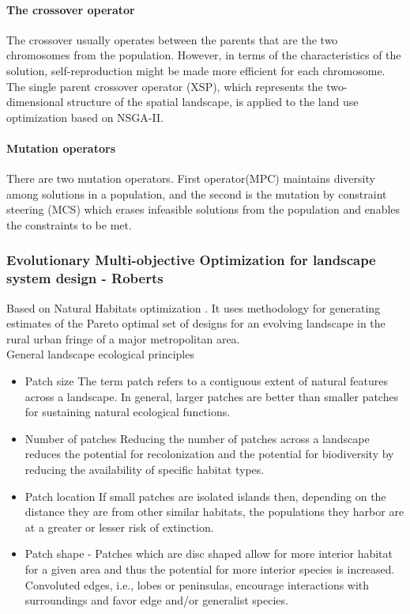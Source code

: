 \documentclass[twoside,10pt]{article}
\begin{document}
\paragraph*{The crossover operator}
The crossover usually operates between the parents that are the two chromosomes from the population. However, in terms of the characteristics of the solution, self-reproduction might be made more efficient for each chromosome. The single parent crossover operator (XSP), which represents the two-dimensional structure of the spatial landscape, is applied to the land use optimization based on NSGA-II.

\paragraph*{Mutation operators}
There are two mutation operators. First operator(MPC) maintains diversity among solutions in a population, and the second is the mutation by constraint steering (MCS) which erases infeasible solutions from the population and enables the constraints to be met. 

\subsubsection{Evolutionary Multi-objective Optimization for landscape system design - Roberts}
 Based on Natural Habitats optimization . It uses methodology for generating estimates of the Pareto optimal set of designs for an evolving landscape in the rural urban fringe of a major metropolitan area.\\
 General landscape ecological principles
\begin{itemize}
  \item Patch size The term patch refers to a contiguous extent of natural features across
a landscape. In general, larger patches are better than smaller patches for
sustaining natural ecological functions.
  \item Number of patches Reducing the number of patches across a landscape reduces
the potential for recolonization and the potential for biodiversity by reducing the
availability of specific habitat types.
  \item Patch location If small patches are isolated islands then, depending on the
distance they are from other similar habitats, the populations they harbor are at a
greater or lesser risk of extinction.
  \item Patch shape -  Patches which are disc shaped allow for more interior habitat for a
given area and thus the potential for more interior species is increased. Convoluted
edges, i.e., lobes or peninsulas, encourage interactions with surroundings and favor
edge and/or generalist species.
\end{itemize}
\end{document}

